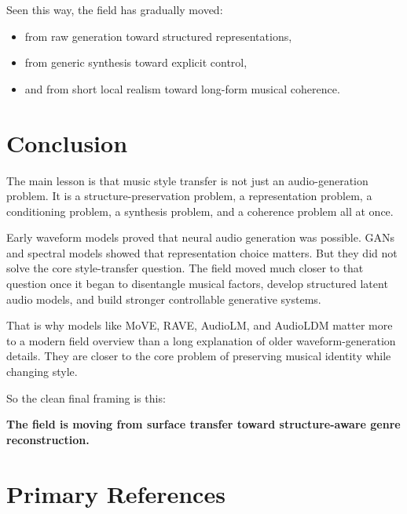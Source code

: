 \documentclass[11pt]{article}
\begin{document}
Seen this way, the field has gradually moved:

\begin{itemize}
\item from raw generation toward structured representations,
\item from generic synthesis toward explicit control,
\item and from short local realism toward long-form musical coherence.
\end{itemize}

\section{Conclusion}

The main lesson is that music style transfer is not just an audio-generation problem. It is a structure-preservation problem, a representation problem, a conditioning problem, a synthesis problem, and a coherence problem all at once.

Early waveform models proved that neural audio generation was possible. GANs and spectral models showed that representation choice matters. But they did not solve the core style-transfer question. The field moved much closer to that question once it began to disentangle musical factors, develop structured latent audio models, and build stronger controllable generative systems.

That is why models like MoVE, RAVE, AudioLM, and AudioLDM matter more to a modern field overview than a long explanation of older waveform-generation details. They are closer to the core problem of preserving musical identity while changing style.

So the clean final framing is this:

\begin{center}
\textbf{The field is moving from surface transfer toward structure-aware genre reconstruction.}
\end{center}

\section{Primary References}
\end{document}
